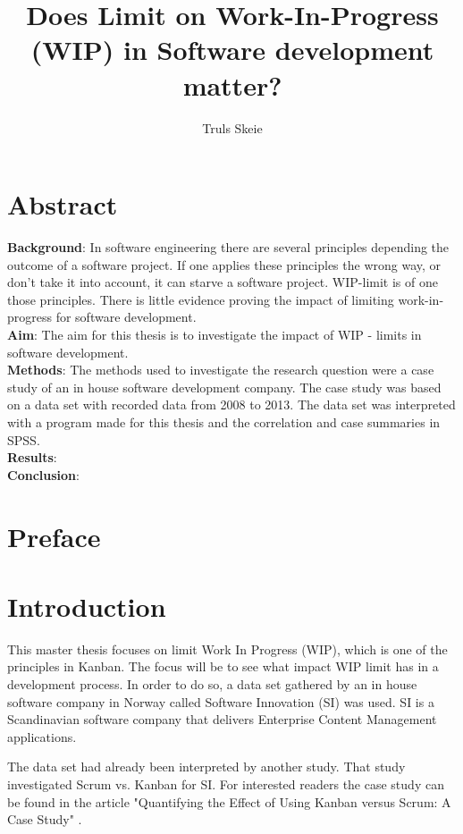 \documentclass[UKenglish]{ifimaster}  %
\title{Does Limit on Work-In-Progress (WIP) in Software development matter?}        %
\author{Truls Skeie}                      %
\begin{document}
\ififorside{}
\frontmatter{}
\maketitle{}

\chapter*{Abstract}                   %
\textbf{Background}: 
In software engineering there are several principles depending the outcome of a software project. If one applies these principles the wrong way, or don't take it into account, it can starve a software project. WIP-limit is of one those principles. There is little evidence proving the impact of limiting work-in-progress for software development.\\
\textbf{Aim}: 
The aim for this thesis is to investigate the impact of WIP - limits in software development. \\
\textbf{Methods}:
The methods used to investigate the research question were a case study of an in house software development company. The case study was based on a data set with recorded data from 2008 to 2013. The data set was interpreted with a program made for this thesis and the correlation and case summaries in SPSS.\\
\textbf{Results}:\\
\textbf{Conclusion}:\\

\tableofcontents{}
\listoffigures{}
\listoftables{}
\lstlistoflistings{}

\chapter*{Preface}                    %

\mainmatter{}
\chapter{Introduction}
\label{chap:intro}
This master thesis focuses on limit Work In Progress (WIP), which is one of the principles in Kanban. The focus will be to see what impact WIP limit has in a development process. In order to do so, a data set gathered by an in house software company in Norway called Software Innovation (SI) was used. SI is a Scandinavian software company that delivers Enterprise Content Management applications.

The data set had already been interpreted by another study. That study investigated Scrum vs. Kanban for SI. For interested readers the case study can be found in the article "Quantifying the Effect of Using Kanban versus Scrum: A Case Study" \parencite{Dag}. 
\end{document}
